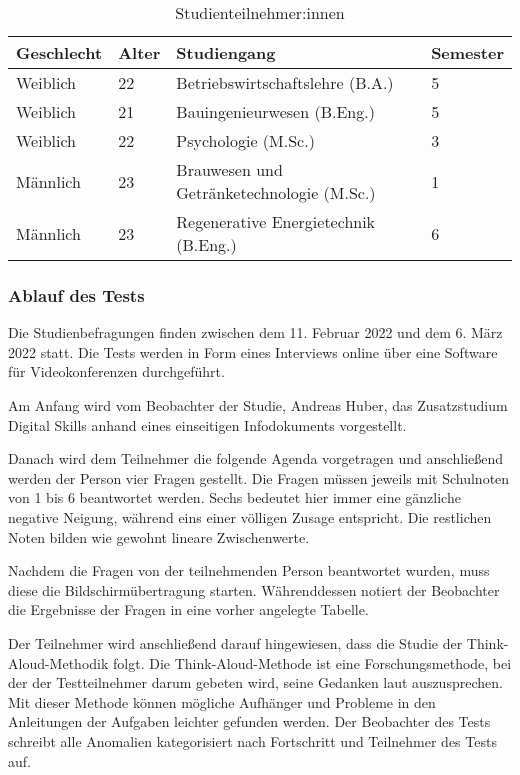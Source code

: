 \begin{table}[H]
\renewcommand*{\arraystretch}{1.6}
\centering
\begin{tabular}{|l|l|l|l|}
\hline
\textbf{Geschlecht} & \textbf{Alter} & \textbf{Studiengang}                      & \textbf{Semester} \\ \hline
Weiblich            & 22             & Betriebswirtschaftslehre (B.A.)           & 5                 \\ \hline
Weiblich            & 21             & Bauingenieurwesen (B.Eng.)                & 5                 \\ \hline
Weiblich            & 22             & Psychologie (M.Sc.)                       & 3                 \\ \hline
Männlich            & 23             & Brauwesen und Getränketechnologie (M.Sc.) & 1                 \\ \hline
Männlich            & 23             & Regenerative Energietechnik (B.Eng.)     & 6                 \\ \hline
\end{tabular}
\caption{Studienteilnehmer:innen}

\label{table:studie-teilnehmende}
\end{table}

\subsubsection{Ablauf des Tests}
Die Studienbefragungen finden zwischen dem 11. Februar 2022 und dem 6. März
2022 statt. Die Tests werden in Form eines Interviews online über eine Software
für Videokonferenzen durchgeführt.

Am Anfang wird vom Beobachter der Studie, Andreas Huber, das Zusatzstudium
Digital Skills anhand eines einseitigen Infodokuments vorgestellt.

Danach wird dem Teilnehmer die folgende Agenda vorgetragen und anschließend
werden der Person vier Fragen gestellt. Die Fragen müssen jeweils mit Schulnoten
von 1 bis 6 beantwortet werden. Sechs bedeutet hier immer eine gänzliche
negative Neigung, während eins einer völligen Zusage entspricht. Die restlichen
Noten bilden wie gewohnt lineare Zwischenwerte.

Nachdem die Fragen von der teilnehmenden Person beantwortet wurden, muss diese
die Bildschirmübertragung starten. Währenddessen notiert der Beobachter die
Ergebnisse der Fragen in eine vorher angelegte Tabelle.

Der Teilnehmer wird anschließend darauf hingewiesen, dass die Studie der
Think-Aloud-Methodik folgt. Die Think-Aloud-Methode ist eine Forschungsmethode,
bei der der Testteilnehmer darum gebeten wird, seine Gedanken laut
auszusprechen. Mit dieser Methode können mögliche Aufhänger und Probleme in den
Anleitungen der Aufgaben leichter gefunden werden. Der Beobachter des Tests
schreibt alle Anomalien kategorisiert nach Fortschritt und Teilnehmer des Tests
auf. \parencite{think-aloud}

